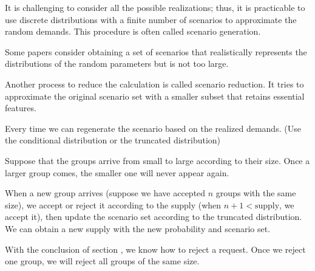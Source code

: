 %
% 

It is challenging to consider all the possible realizations; thus, it is practicable to use discrete distributions with a finite number of scenarios to approximate the random demands. This procedure is often called scenario generation.

Some papers consider obtaining a set of scenarios that realistically represents the distributions of the random parameters but is not too large. \cite{feng2013scenario} \cite{casey2005scenario}
\cite{henrion2018problem}

Another process to reduce the calculation is called scenario reduction. It tries to approximate the original scenario set with a smaller subset that retains essential features.



Every time we can regenerate the scenario based on the realized demands. (Use the conditional distribution or the truncated distribution)


Suppose that the groups arrive from small to large according to their size. Once a larger group comes, the smaller one will never appear again.

When a new group arrives (suppose we have accepted $n$ groups with the same size), we accept or reject it according to the supply (when $n+1 < \text{supply}$, we accept it), then update the scenario set according to the truncated distribution. We can obtain a new supply with the new probability and scenario set.

With the conclusion of section , we know how to reject a request. Once we reject one group, we will reject all groups of the same size. 


\newpage
